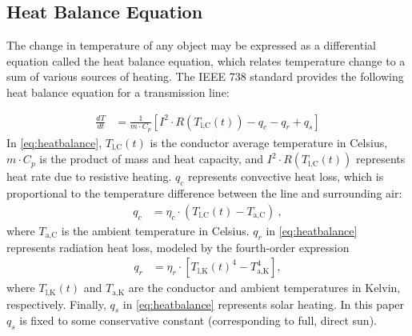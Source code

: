 \documentclass[journal,twoside]{IEEEtran}
\begin{document}



\subsection{Heat Balance Equation}
The change in temperature of any object may be expressed as a differential equation called the heat balance equation, which relates temperature change to a sum of various sources of heating. The IEEE 738 standard \cite{ieee2013} provides the following heat balance equation for a transmission line:

\begin{align}\label{eq:heatbalance}
\frac{dT}{dt} &= \frac{1}{m\cdot C_p}\left[I^2\cdot R(T_\text{l,C}(t)) - q_c - q_r + q_s \right]
\end{align}
In \eqref{eq:heatbalance}, $T_\text{l,C}(t)$ is the conductor average temperature in Celsius, $m\cdot C_p$ is the product of mass and heat capacity, and $I^2\cdot R(T_\text{l,C}(t))$ represents heat rate due to resistive heating. $q_c$ represents convective heat loss, which is proportional to the temperature difference between the line and surrounding air:
\begin{align}\label{eq:qc}
q_c &= \eta_c\cdot(T_\text{l,C}(t) - T_\text{a,C})~,
\end{align}
where $T_\text{a,C}$ is the ambient temperature in Celsius. $q_r$ in \eqref{eq:heatbalance} represents radiation heat loss, modeled by the fourth-order expression
\begin{align}\label{eq:qr}
 q_r &= \eta_r\cdot\left[T_\text{l,K}(t)^4 - T_\text{a,K}^4\right],
\end{align}
where $T_\text{l,K}(t)$ and $T_\text{a,K}$ are the conductor and ambient temperatures in Kelvin, respectively. Finally, $q_s$ in \eqref{eq:heatbalance} represents solar heating. In this paper $q_s$ is fixed to some conservative constant (corresponding to full, direct sun).
\end{document}
